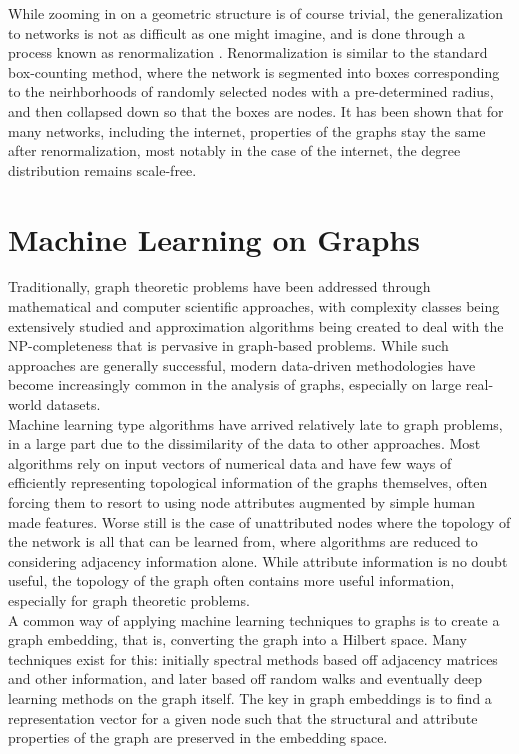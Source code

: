 \documentclass[12pt,twoside]{report}
\begin{document}
While zooming in on a geometric structure is of course trivial, the generalization to networks is not as difficult as one might imagine, and is done through a process known as renormalization \cite{song2005self}. Renormalization is similar to the standard box-counting method, where the network is segmented into boxes corresponding to the neirhborhoods of randomly selected nodes with a pre-determined radius, and then collapsed down so that the boxes are nodes. It has been shown that for many networks, including the internet, properties of the graphs stay the same after renormalization, most notably in the case of the internet, the degree distribution remains scale-free. \\

\section{Machine Learning on Graphs}

Traditionally, graph theoretic problems have been addressed through mathematical and computer scientific approaches, with complexity classes being extensively studied and approximation algorithms being created to deal with the NP-completeness that is pervasive in graph-based problems. While such approaches are generally successful, modern data-driven methodologies have become increasingly common in the analysis of graphs, especially on large real-world datasets. \\

Machine learning type algorithms have arrived relatively late to graph problems, in a large part due to the dissimilarity of the data to other approaches. Most algorithms rely on input vectors of numerical data and have few ways of efficiently representing topological information of the graphs themselves, often forcing them to resort to using node attributes augmented by simple human made features. Worse still is the case of unattributed nodes where the topology of the network is all that can be learned from, where algorithms are reduced to considering adjacency information alone. While attribute information is no doubt useful, the topology of the graph often contains more useful information, especially for graph theoretic problems. \\ 

A common way of applying machine learning techniques to graphs is to create a graph embedding, that is, converting the graph into a Hilbert space. Many techniques exist for this: initially spectral methods based off adjacency matrices and other information, and later based off random walks and eventually deep learning methods on the graph itself. The key in graph embeddings is to find a representation vector for a given node such that the structural and attribute properties of the graph are preserved in the embedding space. \\
\end{document}
